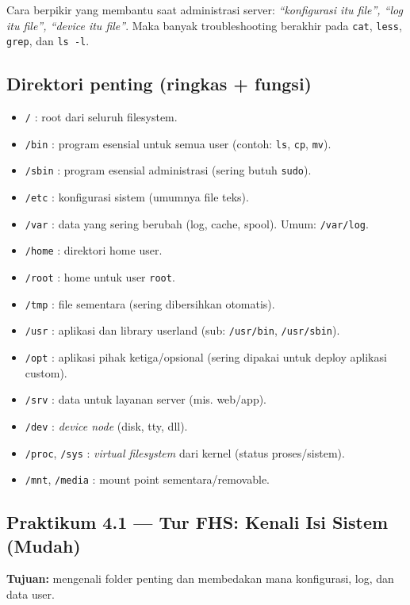 \begin{tipbox}
Cara berpikir yang membantu saat administrasi server:
\textit{``konfigurasi itu file'', ``log itu file'', ``device itu file''}.
Maka banyak troubleshooting berakhir pada \texttt{cat}, \texttt{less}, \texttt{grep}, dan \texttt{ls -l}.
\end{tipbox}

\subsection*{Direktori penting (ringkas + fungsi)}
\begin{itemize}
    \item \texttt{/} : root dari seluruh filesystem.
    \item \texttt{/bin} : program esensial untuk semua user (contoh: \texttt{ls}, \texttt{cp}, \texttt{mv}).
    \item \texttt{/sbin} : program esensial administrasi (sering butuh \texttt{sudo}).
    \item \texttt{/etc} : konfigurasi sistem (umumnya file teks).
    \item \texttt{/var} : data yang sering berubah (log, cache, spool). Umum: \texttt{/var/log}.
    \item \texttt{/home} : direktori home user.
    \item \texttt{/root} : home untuk user \texttt{root}.
    \item \texttt{/tmp} : file sementara (sering dibersihkan otomatis).
    \item \texttt{/usr} : aplikasi dan library userland (sub: \texttt{/usr/bin}, \texttt{/usr/sbin}).
    \item \texttt{/opt} : aplikasi pihak ketiga/opsional (sering dipakai untuk deploy aplikasi custom).
    \item \texttt{/srv} : data untuk layanan server (mis. web/app).
    \item \texttt{/dev} : \textit{device node} (disk, tty, dll).
    \item \texttt{/proc}, \texttt{/sys} : \textit{virtual filesystem} dari kernel (status proses/sistem).
    \item \texttt{/mnt}, \texttt{/media} : mount point sementara/removable.
\end{itemize}

\subsection*{Praktikum 4.1 --- Tur FHS: Kenali Isi Sistem (Mudah)}
\textbf{Tujuan:} mengenali folder penting dan membedakan mana konfigurasi, log, dan data user.

